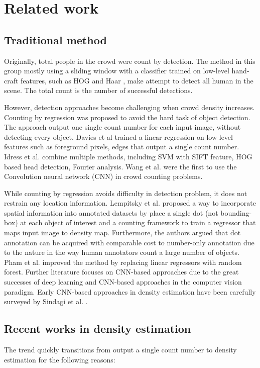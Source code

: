 \section{Related work} \label{sec:related}
\subsection{Traditional method}
Originally, total people in the crowd were count by detection. The method in this group mostly using a sliding window with a classifier trained on low-level hand-craft features, such as HOG \cite{dalal2005histograms} and Haar \cite{lin2001estimation}, make attempt to detect all human in the scene. The total count is the number of successful detections.

However, detection approaches become challenging when crowd density increases. Counting by regression was proposed to avoid the hard task of object detection. The approach output one single count number for each input image, without detecting every object. Davies et al \cite{davies1995crowd} trained a linear regression on low-level features such as foreground pixels, edges that output a single count number. Idress et al. \cite{idrees2013multi} combine multiple methods, including SVM with SIFT feature, HOG based head detection, Fourier analysis. Wang et al. \cite{wang2015deep} were the first to use the Convolution neural network (CNN) in crowd counting problems.

While counting by regression avoids difficulty in detection problem, it does not restrain any location information. Lempitsky et al. \cite{lempitsky2010learning} proposed a way to incorporate spatial information into annotated datasets by place a single dot (not bounding-box) at each object of interest and a counting framework to train a regressor that maps input image to density map. Furthermore, the authors argued that dot annotation can be acquired with comparable cost to number-only annotation due to the nature in the way human annotators count a large number of objects. Pham et al. \cite{7410729} improved the method by replacing linear regressors with random forest. Further literature focuses on CNN-based approaches due to the great successes of deep learning and CNN-based approaches in the computer vision paradigm. Early CNN-based approaches in density estimation have been carefully surveyed by Sindagi et al. \cite{SINDAGI20183}.

\subsection{Recent works in density estimation}
The trend quickly transitions from output a single count number to density estimation for the following reasons: 

